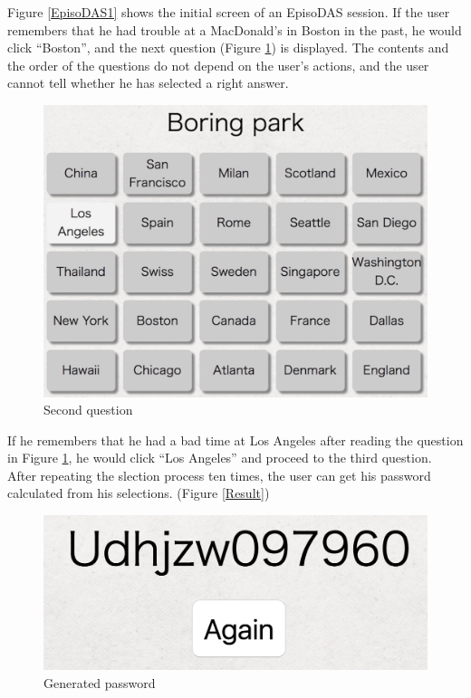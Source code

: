 \documentclass[sigconf]{acmart}
\begin{document}
Figure \ref{EpisoDAS1} shows
the initial screen of an EpisoDAS session.
%
If the user remembers that he had trouble at a MacDonald's in Boston in the past,
he would click ``Boston'', and the next question (Figure \ref{EpisoDAS2}) is displayed.
The contents and the order of the questions
do not depend on the user's actions, and
the user cannot tell whether he has selected a right answer.

\begin{figure}[H]
  \includegraphics[width=12cm,bb=0 0 1396 1062]{figures/EpisoDAS2.jpg}
  \caption{Second question}
  \label{EpisoDAS2}
\end{figure}

If he remembers that he had a bad time at Los Angeles
after reading the question in Figure \ref{EpisoDAS2},
he would click ``Los Angeles'' and proceed to the third question.
%
After repeating the slection process ten times,
the user can get his password
calculated from his selections. (Figure \ref{Result})

\begin{figure}[H]
  \includegraphics[width=12cm,bb=0 0 1160 468]{figures/result.png}
  \caption{Generated password}
  \label{result}
\end{figure}
\end{document}
